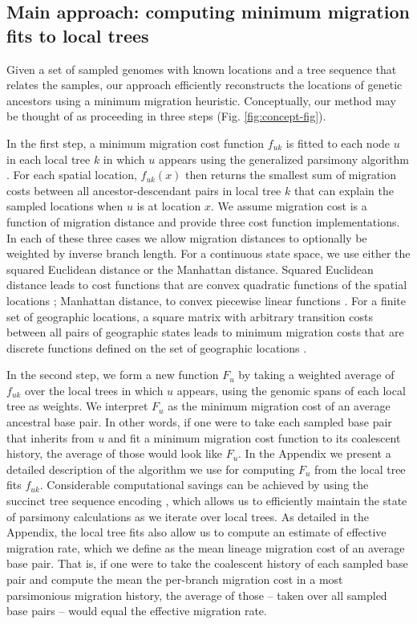 \subsection{Main approach: computing minimum migration fits to local trees}

Given a set of sampled genomes with known locations and a tree sequence that
relates the samples, our approach efficiently reconstructs the locations of 
genetic ancestors using a minimum migration heuristic. Conceptually, our
method may be thought of as proceeding in three steps
(Fig. \ref{fig:concept-fig}).

In the first step, a minimum migration cost function $f_{uk}$ is fitted to each
node $u$ in each local tree $k$ in which $u$ appears using the generalized
parsimony algorithm \citep{Sankoff_1975, Sankoff_Rousseau_1975}. For each 
spatial location, $f_{uk}(x)$ then returns the smallest sum of migration costs
between all ancestor-descendant pairs in local tree $k$ that can explain the
sampled locations when $u$ is at location $x$. We assume migration cost is a function
of migration distance and provide three cost function implementations. In each 
of these three cases we allow migration distances to optionally be weighted by 
inverse branch length. For a continuous state space, we use either the squared
Euclidean distance or the Manhattan distance. Squared Euclidean distance leads
to cost functions that are convex quadratic functions of the spatial locations
\citep{Maddison_1991}; Manhattan distance, to convex piecewise linear functions
\citep{Csuros_2008}. For a finite set of geographic locations, a square matrix 
with arbitrary transition costs between all pairs of geographic states leads to
minimum migration costs that are discrete functions defined on the set of
geographic locations \citep{Clemente_etal_2009}.

In the second step, we form a new function $F_u$ by taking a weighted average 
of $f_{uk}$ over the local trees in which $u$ appears, using the genomic spans
of each local tree as weights. We interpret $F_u$ as the minimum migration cost
of an average ancestral base pair. In other words, if one were to take each
sampled base pair that inherits from $u$ and fit a minimum migration cost function to its
coalescent history, the average of those would look like $F_u$. In the Appendix
we present a detailed description of the algorithm we use for computing
$F_u$ from the local tree fits $f_{uk}$. Considerable computational savings
can be achieved by using the succinct tree sequence encoding
\citep{Kelleher_etal_2016}, which allows us to efficiently maintain
the state of parsimony calculations as we iterate over local trees. As detailed
in the Appendix, the local tree fits also allow us to compute an estimate of
effective migration rate, which we define as the mean lineage migration cost 
of an average base pair. That is, if one were to take the coalescent history of
each sampled base pair and compute the mean the per-branch migration cost in a
most parsimonious migration history, the average of those -- taken over all
sampled base pairs -- would equal the effective migration rate.

